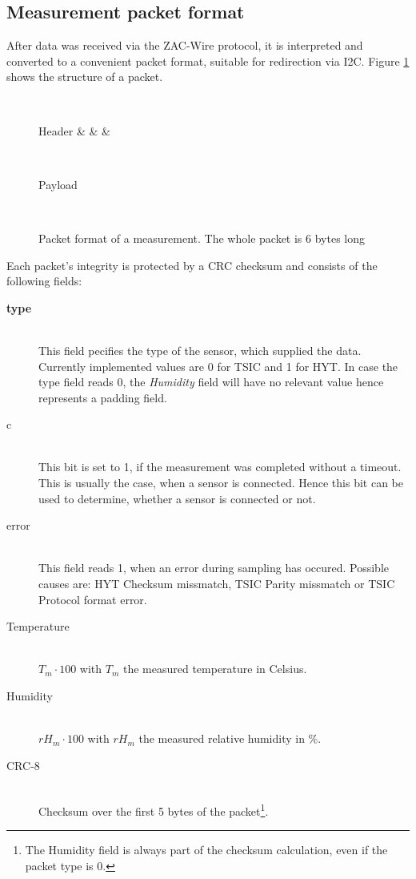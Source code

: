 \documentclass[a4paper]{scrreprt}
\begin{document}
\subsection{Measurement packet format}\label{chap:packet}
After data was received via the ZAC-Wire protocol, it is interpreted and converted to a convenient packet format, suitable for
redirection via I2C. Figure \ref{fig:packet} shows the structure of a packet.
\begin{figure}[Hh!]
	\centering
	\begin{bytefield}[endianness=big, bitwidth=2.1em]{8}
		\\
		\begin{rightwordgroup}{Header}
			 &  &  & 
		\end{rightwordgroup}\\
		\begin{rightwordgroup}{Payload}
			\\
		\end{rightwordgroup}\\
	\end{bytefield}
  \caption{Packet format of a measurement. The whole packet is 6 bytes long}
	\label{fig:packet}
\end{figure}
Each packet's integrity is protected by a CRC checksum and consists of the following fields:\\
\begin{description}
	\item[\textbf{type}] \hfill\\
        This field pecifies the type of the sensor, which supplied the data. Currently implemented values are 0
		for TSIC and 1 for HYT. In case the type field reads 0, the \emph{Humidity} field will have no relevant value hence
		represents a padding field.
	\item[c] \hfill\\
This bit is set to 1, if the measurement was completed without a timeout. This is usually the case, when a
		sensor is connected. Hence this bit can be used to determine, whether a sensor is connected or not.
	\item[error] \hfill\\
This field reads 1, when an error during sampling has occured. Possible causes are: HYT Checksum missmatch,
		TSIC Parity missmatch or TSIC Protocol format error.
	\item[Temperature] \hfill\\
$T_m \cdot 100$ with $T_m$ the measured temperature in Celsius.
	\item[Humidity] \hfill\\
$rH_m \cdot 100$ with $rH_m$ the measured relative humidity in \%.
	\item[CRC-8] \hfill\\
Checksum over the first 5 bytes of the packet\footnote{The Humidity field is always part of the checksum
		calculation, even if the packet type is 0.}.
\end{description}
\end{document}
